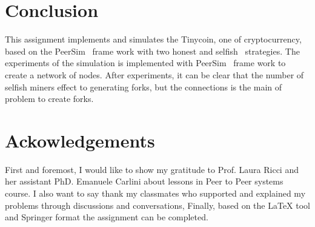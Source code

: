\documentclass[runningheads,a4paper]{llncs}
\begin{document}
\section{Conclusion}
\label{Con}
This assignment implements and simulates the Tinycoin, one of cryptocurrency, based on the PeerSim~\cite{jesi2005peersim} frame work with two honest and selfish~\cite{eyal2014majority} strategies.
The experiments of the simulation is implemented with PeerSim~\cite{jesi2005peersim} frame work to create a network of nodes.
After experiments, it can be clear that the number of selfish miners effect to generating forks, but the connections is the main of problem to create forks.

\section{Ackowledgements}
First and foremost, I would like to show my gratitude to Prof. Laura Ricci and her assistant PhD. Emanuele Carlini about lessons in Peer to Peer systems course. 
I also want to say thank  my classmates who supported and explained my problems through discussions and conversations,
Finally, based on the \LaTeX $ $ tool and Springer format the assignment can be completed.



\end{document}
